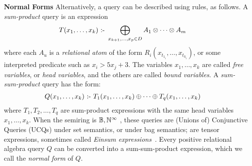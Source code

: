 {\bf Normal Forms} Alternatively, a query can be described using
rules, as follows.  A {\em sum-product} query is an expression
%
\begin{align}
  T(x_1, \ldots, x_k) &\text{ :- } \bigoplus_{x_{k+1}, \ldots,x_p \in D} A_1 \otimes  \cdots \otimes A_m
                        \label{eq:t:monomial}
\end{align}
%
where each $A_u$ is a {\em relational atom} of the form
$R_i(x_{t_{1_{i}}}, \ldots, x_{t_{k_i}})$, or some interpreted predicate such as
$x_i > 5x_j+3$.  The variables $x_1, \ldots, x_k$ are called {\em
  free variables}, or {\em head variables}, and the others are called
{\em bound variables}.
A {\em sum-sum-product} query has the form:
%
\begin{align}
  Q(x_1, \ldots, x_k) &\text{ :- } T_1(x_1, \ldots, x_k) \oplus \cdots \oplus T_q(x_1, \ldots, x_k)
\label{eq:sum:sum:product}
\end{align}
%
where $T_1, T_2, \ldots, T_q$ are sum-product expressions with the
same head variables $x_1, \ldots, x_k$.  When the semiring is
$\mathbb B, \mathbb N^\infty$ , these queries are (Unions of)
Conjunctive Queries (UCQs) under set semantics, or under bag
semantics;  are tensor expressions, sometimes called {\em Einsum
  expressions}~\cite{einsum:rocktaschel}.
%
Every positive relational algebra query $Q$ can be converted into a
sum-sum-product expression, which we call the {\em normal form} of
$Q$.

